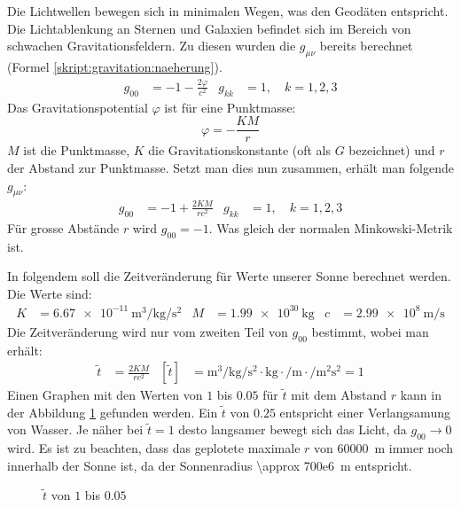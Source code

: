 \begin{refsection}
Die Lichtwellen bewegen sich in minimalen Wegen, was den Geodäten
entspricht.  Die Lichtablenkung an Sternen und Galaxien befindet sich
im Bereich von schwachen Gravitationsfeldern.  Zu diesen wurden die
\(g_{\mu\nu}\) bereits berechnet (Formel
\ref{skript:gravitation:naeherung}).
\begin{align*}
  g_{00} &= -1 -\frac{2\varphi}{c^2} &g_{kk} &= 1,\quad k=1,2,3
\end{align*}
Das Gravitationspotential \(\varphi\) ist für eine Punktmasse:
\begin{equation*}
  \varphi = -\frac{KM}{r}
\end{equation*}
\(M\) ist die Punktmasse, \(K\) die Gravitationskonstante
(oft als \(G\) bezeichnet) und \(r\) der Abstand zur Punktmasse.
Setzt man dies nun zusammen, erhält man folgende \(g_{\mu\nu}\):
\begin{align*}
  g_{00} &= -1 +\frac{2KM}{rc^2} &g_{kk} &= 1,\quad k=1,2,3
\end{align*}
Für grosse Abstände \(r\) wird \(g_{00}=-1\).  Was gleich der normalen
Minkowski-Metrik ist.

\begin{beispiel}
  In folgendem soll die Zeitveränderung für Werte unserer Sonne
  berechnet werden.  Die Werte sind:
  \begin{align*}
    K &= \SI{6.67e-11}{\meter\cubed\per\kilogram\per\second\squared}
    &M &= \SI{1.99e30}{\kilogram}
    &c &= \SI{2.99e8}{\meter\per\second}
  \end{align*}
  Die Zeitveränderung wird nur vom zweiten Teil von \(g_{00}\)
  bestimmt, wobei man erhält:
  \begin{align*}
    \tilde{t} &= \frac{2KM}{rc^2}
    &\left[\tilde{t}\right] &=
                              \si{\meter\cubed\per\kilogram\per\second\squared}
                              \cdot \si{\kilogram}
                              \cdot \si{\per\meter}
                              \cdot \si{\per\meter\squared\second\squared}
                              = 1
  \end{align*}
  Einen Graphen mit den Werten von \(1\) bis \(0.05\) für
  \(\tilde{t}\) mit dem Abstand \(r\) kann in der Abbildung
  \ref{fig:bsp1} gefunden werden.  Ein \(\tilde{t}\) von \(0.25\)
  entspricht einer Verlangsamung von Wasser.  Je näher bei
  \(\tilde{t}=1\) desto langsamer bewegt sich das Licht, da
  \(g_{00} \rightarrow 0\) wird.  Es ist zu beachten, dass das
  geplotete maximale \(r\) von \SI{60000}{\meter} immer noch innerhalb
  der Sonne ist, da der Sonnenradius \SI{\approx 700e6}{\meter}
  entspricht.
  \begin{figure}
    \centering
    
    \caption{\(\tilde{t}\) von \(1\) bis \(0.05\)}
    \label{fig:bsp1}
  \end{figure}
\end{beispiel}


\end{refsection}
